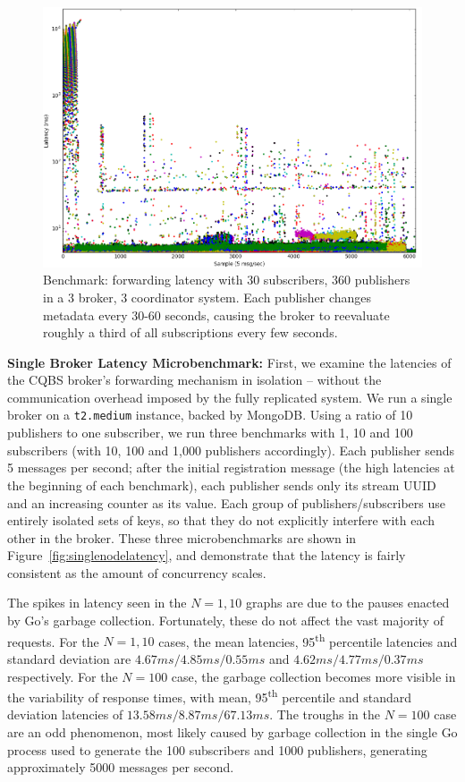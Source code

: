\begin{figure}[t]
\centering
\includegraphics[width=\linewidth]{figs/fullsystem_metadatachange.png}
\caption{Benchmark: forwarding latency with 30 subscribers, 360 publishers in a 3 broker, 3 coordinator system. Each publisher changes metadata every 30-60 seconds, causing the broker to reevaluate roughly a third of all subscriptions every few seconds.}
\label{fig:fullsystem_metadatachange}
\end{figure}


\textbf{Single Broker Latency Microbenchmark:} First, we examine the latencies of the CQBS broker's forwarding mechanism in isolation -- without the communication overhead imposed by the fully replicated system.
We run a single broker on a \texttt{t2.medium} instance, backed by MongoDB.
Using a ratio of 10 publishers to one subscriber, we run three benchmarks with 1, 10 and 100 subscribers (with 10, 100 and 1,000 publishers accordingly).
Each publisher sends 5 messages per second; after the initial registration message (the high latencies at the beginning of each benchmark), each publisher sends only its stream UUID and an increasing counter as its value.
Each group of publishers/subscribers use entirely isolated sets of keys, so that they do not explicitly interfere with each other in the broker.
These three microbenchmarks are shown in Figure~\ref{fig:singlenodelatency}, and demonstrate that the latency is fairly consistent as the amount of concurrency scales.

The spikes in latency seen in the $N=1,10$ graphs are due to the pauses enacted by Go's garbage collection.
Fortunately, these do not affect the vast majority of requests.
For the $N=1,10$ cases, the mean latencies, 95\textsuperscript{th} percentile latencies and standard deviation are $4.67ms/4.85ms/0.55ms$ and $4.62ms/4.77ms/0.37ms$ respectively.
For the $N=100$ case, the garbage collection becomes more visible in the variability of response times, with mean, 95\textsuperscript{th} percentile and standard deviation latencies of $13.58ms/8.87ms/67.13ms$.
The troughs in the $N=100$ case are an odd phenomenon, most likely caused by garbage collection in the single Go process used to generate the 100 subscribers and 1000 publishers, generating approximately 5000 messages per second.

